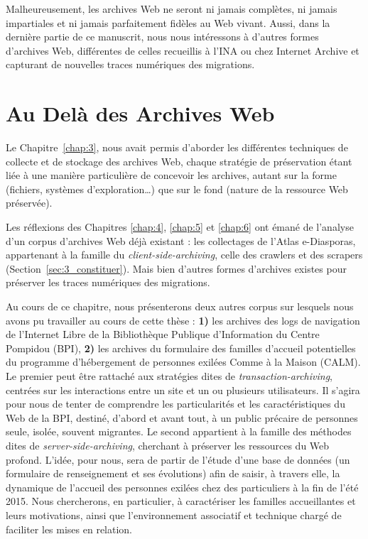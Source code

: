 \documentclass[symmetric,justified,marginals=raggedouter]{tufte-book}
\begin{document}
Malheureusement, les archives Web ne seront ni jamais complètes, ni jamais impartiales et ni jamais parfaitement fidèles au Web vivant. Aussi, dans la dernière partie de ce manuscrit, nous nous intéressons à d'autres formes d'archives Web, différentes de celles recueillis à l'INA ou chez Internet Archive et capturant de nouvelles traces numériques des migrations.



\chapter{Au Delà des Archives Web}
\label{chap:7}

\noindent Le Chapitre~\ref{chap:3}, nous avait permis d'aborder les différentes techniques de collecte et de stockage des archives Web, chaque stratégie de préservation étant liée à une manière particulière de concevoir les archives, autant sur la forme (fichiers, systèmes d'exploration\ldots{}) que sur le fond (nature de la ressource Web préservée).

Les réflexions des Chapitres \ref{chap:4}, \ref{chap:5} et \ref{chap:6} ont émané de l'analyse d'un corpus d'archives Web déjà existant : les collectages de l'Atlas e-Diasporas, appartenant à la famille du \textit{client-side-archiving}, celle des crawlers et des scrapers (Section~\ref{sec:3_constituer}). Mais bien d'autres formes d'archives existes pour préserver les traces numériques des migrations. 

Au cours de ce chapitre, nous présenterons deux autres corpus sur lesquels nous avons pu travailler au cours de cette thèse : \textbf{1)} les archives des logs de navigation de l'Internet Libre de la Bibliothèque Publique d'Information du Centre Pompidou (BPI), \textbf{2)} les archives du formulaire des familles d'accueil potentielles du programme d'héber\-gement de personnes exilées Comme à la Maison (CALM). Le premier peut être rattaché aux stratégies dites de \textit{transaction-archiving}, centrées sur les interactions entre un site et un ou plusieurs utilisateurs. Il s'agira pour nous de tenter de comprendre les particularités et les caractéristiques du Web de la BPI, destiné, d'abord et avant tout, à un public précaire de personnes seule, isolée, souvent migrantes. Le second appartient à la famille des méthodes dites de \textit{server-side-archiving}, cherchant à préserver les ressources du Web profond. L'idée, pour nous, sera de partir de l'étude d'une base de données (un formulaire de renseignement et ses évolutions) afin de saisir, à travers elle, la dynamique de l'accueil des personnes exilées chez des particuliers à la fin de l'été 2015. Nous chercherons, en particulier, à caractériser les familles accueillantes et leurs motivations, ainsi que l'environnement associatif et technique chargé de faciliter les mises en relation.  
\end{document}
